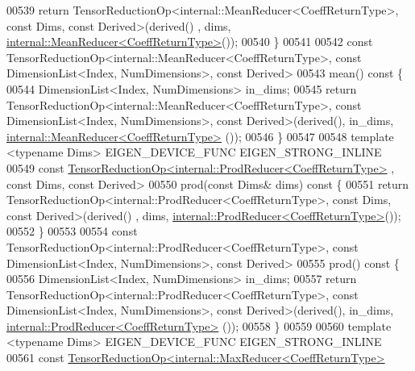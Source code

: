 \begin{DoxyCode}
00539       \textcolor{keywordflow}{return} TensorReductionOp<internal::MeanReducer<CoeffReturnType>, \textcolor{keyword}{const} Dims, \textcolor{keyword}{const} Derived>(derived()
      , dims, \hyperlink{struct_eigen_1_1internal_1_1_mean_reducer}{internal::MeanReducer<CoeffReturnType>}());
00540     \}
00541 
00542     \textcolor{keyword}{const} TensorReductionOp<internal::MeanReducer<CoeffReturnType>, \textcolor{keyword}{const} DimensionList<Index,
       NumDimensions>, \textcolor{keyword}{const} Derived>
00543     mean()\textcolor{keyword}{ const }\{
00544       DimensionList<Index, NumDimensions> in\_dims;
00545       \textcolor{keywordflow}{return} TensorReductionOp<internal::MeanReducer<CoeffReturnType>, \textcolor{keyword}{const} DimensionList<Index,
       NumDimensions>, \textcolor{keyword}{const} Derived>(derived(), in\_dims, \hyperlink{struct_eigen_1_1internal_1_1_mean_reducer}{internal::MeanReducer<CoeffReturnType>}
      ());
00546     \}
00547 
00548     \textcolor{keyword}{template} <\textcolor{keyword}{typename} Dims> EIGEN\_DEVICE\_FUNC EIGEN\_STRONG\_INLINE
00549     \textcolor{keyword}{const} \hyperlink{class_eigen_1_1_tensor_reduction_op}{TensorReductionOp<internal::ProdReducer<CoeffReturnType>}
      , \textcolor{keyword}{const} Dims, \textcolor{keyword}{const} Derived>
00550     prod(\textcolor{keyword}{const} Dims& dims)\textcolor{keyword}{ const }\{
00551       \textcolor{keywordflow}{return} TensorReductionOp<internal::ProdReducer<CoeffReturnType>, \textcolor{keyword}{const} Dims, \textcolor{keyword}{const} Derived>(derived()
      , dims, \hyperlink{struct_eigen_1_1internal_1_1_prod_reducer}{internal::ProdReducer<CoeffReturnType>}());
00552     \}
00553 
00554     \textcolor{keyword}{const} TensorReductionOp<internal::ProdReducer<CoeffReturnType>, \textcolor{keyword}{const} DimensionList<Index,
       NumDimensions>, \textcolor{keyword}{const} Derived>
00555     prod()\textcolor{keyword}{ const }\{
00556       DimensionList<Index, NumDimensions> in\_dims;
00557       \textcolor{keywordflow}{return} TensorReductionOp<internal::ProdReducer<CoeffReturnType>, \textcolor{keyword}{const} DimensionList<Index,
       NumDimensions>, \textcolor{keyword}{const} Derived>(derived(), in\_dims, \hyperlink{struct_eigen_1_1internal_1_1_prod_reducer}{internal::ProdReducer<CoeffReturnType>}
      ());
00558     \}
00559 
00560     \textcolor{keyword}{template} <\textcolor{keyword}{typename} Dims> EIGEN\_DEVICE\_FUNC EIGEN\_STRONG\_INLINE
00561     \textcolor{keyword}{const} \hyperlink{class_eigen_1_1_tensor_reduction_op}{TensorReductionOp<internal::MaxReducer<CoeffReturnType>}

\end{DoxyCode}
